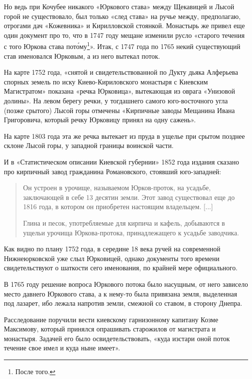Но ведь при Кочубее никакого «Юркового става» между Щекавицей и Лысой горой не существовало, был только «след става» на ручье между, предполагаю, отрогами дач «Кожевника» и Кирилловской стоянкой. Монастырь же привел еще один документ про то, что в 1747 году мещане изменили русло «старого течения с того Юркова става пот\'ому\footnote{После того.}». Итак, с 1747 года по 1765 некий существующий став именовался Юрковым, а из него вытекал поток.

На карте 1752 года, «снятой и свидетельствованной по Дукту дьяка Алферьева спорных земель по иску Киево-Кириловского монастыря с Киевским Магистратом» показана «речка Юрковица», вытекающая из оврага «Унизовой долины». На левом берегу речки, у тогдашнего самого юго-восточ\-ного угла (позже срытого) Лысой горы отмечены «Кирпичные заводы Мещанина Ивана Григоровича, который речку Юрковицу принял на одну сажень».

На карте 1803 года эта же речка вытекает из пруда в ущелье при срытом позднее склоне Лысой горы, у западной границы воинской части. %

И в «Статистическом описании Киевской губернии» 1852 года издания\cite{fundstat} сказано про кирпичный завод гражданина Романовского, стоявший юго-западней:

\begin{quotation}
Он устроен в урочище, называемом Юрков-проток, на усадьбе, заключающей в себе 13 десятин земли. Этот завод существовал еще до 1816 года, в котором он приобретен настоящим владельцем. [...]

Глина и песок, употребляемые для кирпича и кафель, добываются в ущельи урочища Юркова-протока, принадлежащего к усадьбе заводчика.
\end{quotation}

Как видно по плану 1752 года, в середине 18 века ручей на современной Нижнеюрковской уже слыл Юрковицей, однако документы того времени свидетельствуют о шаткости сего именования, по крайней мере официального.

В 1765 году решение вопроса Юркового потока было насущным, от него зависело место давнего Юркового става, а к нему-то была привязана земля, выделенная под лазарет, ибо лежала напротив земли, смежной со ставом, в сторону Днепра.

Расследование поручили вести киевскому гарнизонному капитану Козме Максимову, который принялся опрашивать старожилов от магистрата и монастыря. Задачей его было освидетельствовать, «куда изстари оной поток течение свое имел и куда ныне имеет».

